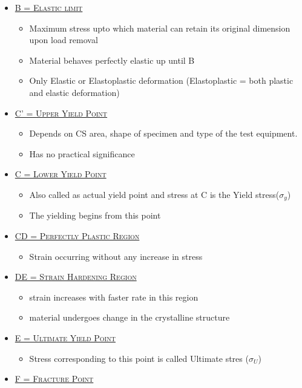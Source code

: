 \documentclass[8pt]{report}
\begin{document}
\begin{itemize}
\begin{itemize}
\begin{itemize}
					\end{itemize}
				\item \underline{\textsc{B = Elastic limit}}
					\begin{itemize}
						\item Maximum stress upto which material can retain its original dimension upon load removal
						\item Material behaves perfectly elastic up until B
						\item Only Elastic or Elastoplastic deformation (Elastoplastic = both plastic and elastic deformation)
					\end{itemize}
				\item \underline{\textsc{C' = Upper Yield Point}}
					\begin{itemize}
						\item Depends on CS area, shape of specimen and type of the test equipment. 
						\item Has no practical significance
					\end{itemize}
				\item \underline{\textsc{C = Lower Yield Point}}
					\begin{itemize}
						\item Also called as actual yield point and stress at C is the Yield stress($\sigma_y$)
						\item The yielding begins from this point
					\end{itemize}
				\item \underline{\textsc{CD = Perfectly Plastic Region}}
					\begin{itemize}
						\item Strain occurring without any increase in stress
					\end{itemize}
				\item \underline{\textsc{DE = Strain Hardening Region}}
					\begin{itemize}
						\item strain increases with faster rate in this region
						\item material undergoes change in the crystalline structure
					\end{itemize}
				\item \underline{\textsc{E = Ultimate Yield Point}}
					\begin{itemize}
						\item Stress corresponding to this point is called Ultimate stres ($\sigma_U$)
					\end{itemize}
				\item \underline{\textsc{F = Fracture Point}}

\end{itemize}
\end{itemize}
\end{document}
